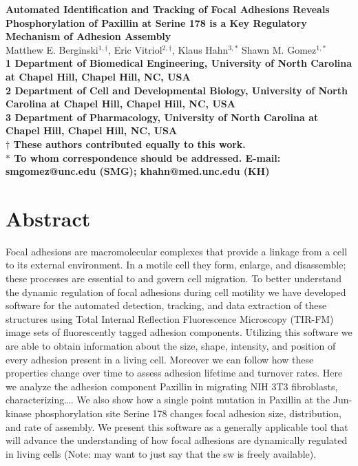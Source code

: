 \documentclass[10pt]{article}
\date{}
\begin{document}
\begin{flushleft}
{\Large
\textbf{Automated Identification and Tracking of Focal Adhesions Reveals Phosphorylation of Paxillin at Serine 178 is a Key Regulatory Mechanism of Adhesion Assembly}
}
\\
Matthew E. Berginski$^{1,\dagger}$, 
Eric Vitriol$^{2,\dagger}$, 
Klaus Hahn$^{3,\ast}$
Shawn M. Gomez$^{1,\ast}$
\\
\bf{1} Department of Biomedical Engineering, University of North Carolina at Chapel Hill, Chapel Hill, NC, USA
\\
\bf{2} Department of Cell and Developmental Biology, University of North Carolina at Chapel Hill, Chapel Hill, NC, USA
\\
\bf{3} Department of Pharmacology, University of North Carolina at Chapel Hill, Chapel Hill, NC, USA
\\
$\dagger$ These authors contributed equally to this work.
\\
$\ast$ To whom correspondence should be addressed. E-mail: smgomez@unc.edu (SMG); khahn@med.unc.edu (KH)
\end{flushleft}

\section*{Abstract}

Focal adhesions are macromolecular complexes that provide a linkage from a cell
to its external environment. In a motile cell they form, enlarge, and
disassemble; these processes are essential to and govern cell migration. To
better understand the dynamic regulation of focal adhesions during cell motility
we have developed software for the automated detection, tracking, and data
extraction of these structures using Total Internal Reflection Fluorescence
Microscopy (TIR-FM) image sets of fluorescently tagged adhesion components.
Utilizing this software we are able to obtain information about the size, shape,
intensity, and position of every adhesion present in a living cell. Moreover we
can follow how these properties change over time to assess adhesion lifetime and
turnover rates. Here we analyze the adhesion component Paxillin in migrating NIH
3T3 fibroblasts, characterizing\ldots. We also show how a single point mutation
in Paxillin at the Jun-kinase phosphorylation site Serine 178 changes focal
adhesion size, distribution, and rate of assembly. We present this software as a
generally applicable tool that will advance the understanding of how focal
adhesions are dynamically regulated in living cells (Note: may want to just say
that the sw is freely available).
\end{document}
